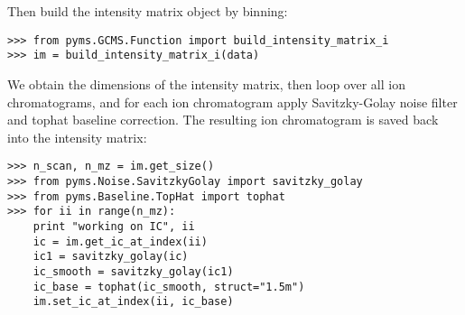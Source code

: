 Then build the intensity matrix object by binning:

\begin{verbatim}
>>> from pyms.GCMS.Function import build_intensity_matrix_i
>>> im = build_intensity_matrix_i(data)
\end{verbatim}

We obtain the dimensions of the intensity matrix, then loop
over all ion chromatograms, and for each ion chromatogram
apply Savitzky-Golay noise filter and tophat baseline correction.
The resulting ion chromatogram is saved back into the intensity
matrix:

\begin{verbatim}
>>> n_scan, n_mz = im.get_size()
>>> from pyms.Noise.SavitzkyGolay import savitzky_golay
>>> from pyms.Baseline.TopHat import tophat
>>> for ii in range(n_mz):
	print "working on IC", ii
	ic = im.get_ic_at_index(ii)
	ic1 = savitzky_golay(ic)
	ic_smooth = savitzky_golay(ic1)
	ic_base = tophat(ic_smooth, struct="1.5m")
	im.set_ic_at_index(ii, ic_base)
\end{verbatim}



